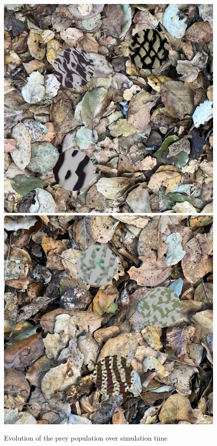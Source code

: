 \documentclass[sigconf]{acmart}
\begin{document}
\begin{figure}
    \includegraphics[scale=0.16]{images/20221016_step_4864.png}
    \hfill
    \includegraphics[scale=0.16]{images/20221016_step_5564.png}
    \caption{Evolution of the prey population over simulation time}
    \label{fig:time_sequence}
\end{figure}
\end{document}
